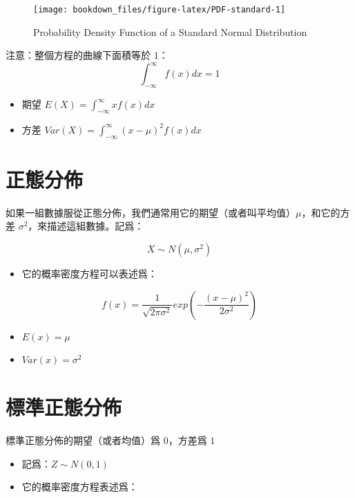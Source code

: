 \documentclass[]{ctexbook}
\providecommand{\tightlist}{%
  \setlength{\itemsep}{0pt}\setlength{\parskip}{0pt}}
\begin{document}
\begin{figure}

{\centering \texttt{[image: bookdown\_files/figure-latex/PDF-standard-1]} 

}

\caption{Probability Density Function of a Standard Normal Distribution}\label{fig:PDF-standard}
\end{figure}

注意：整個方程的曲線下面積等於 \(1\)：
\[\int_{-\infty}^\infty f(x)dx=1\]

\begin{itemize}
\tightlist
\item
  期望 \(E(X)=\int_{-\infty}^\infty xf(x)dx\)
\item
  方差 \(Var(X)=\int_{-\infty}^\infty (x-\mu)^2f(x)dx\)
\end{itemize}

\section{正態分佈}\label{-1}

如果一組數據服從正態分佈，我們通常用它的期望（或者叫平均值）\(\mu\)，和它的方差
\(\sigma^2\)，來描述這組數據。記爲：

\[X \sim N(\mu, \sigma^2)\]

\begin{itemize}
\tightlist
\item
  它的概率密度方程可以表述爲：
\end{itemize}

\[f(x)=\frac{1}{\sqrt{2\pi\sigma^2}}exp(-\frac{(x-\mu)^2}{2\sigma^2})\]

\begin{itemize}
\tightlist
\item
  \(E(x) =\mu\)
\item
  \(Var(x)=\sigma^2\)
\end{itemize}

\section{標準正態分佈}

標準正態分佈的期望（或者均值）爲 \(0\)，方差爲 \(1\)

\begin{itemize}
\tightlist
\item
  記爲：\(Z \sim N(0,1)\)
\item
  它的概率密度方程表述爲：
\end{itemize}
\end{document}

